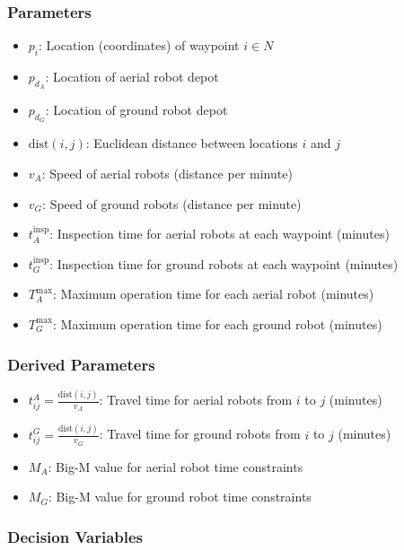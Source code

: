 \documentclass{article}
\begin{document}
			\subsubsection{Parameters}

				\begin{itemize}
				\item $p_i$: Location (coordinates) of waypoint $i \in N$
				\item $p_{d_A}$: Location of aerial robot depot
				\item $p_{d_G}$: Location of ground robot depot
				\item $\text{dist}(i,j)$: Euclidean distance between locations $i$ and $j$
				\item $v_A$: Speed of aerial robots (distance per minute)
				\item $v_G$: Speed of ground robots (distance per minute)
				\item $t_A^{\text{insp}}$: Inspection time for aerial robots at each waypoint (minutes)
				\item $t_G^{\text{insp}}$: Inspection time for ground robots at each waypoint (minutes)
				\item $T_A^{\max}$: Maximum operation time for each aerial robot (minutes)
				\item $T_G^{\max}$: Maximum operation time for each ground robot (minutes)
				\end{itemize}

			\subsubsection{Derived Parameters}

				\begin{itemize}
				\item $t_{ij}^{A} = \frac{\text{dist}(i,j)}{v_A}$: Travel time for aerial robots from $i$ to $j$ (minutes)
				\item $t_{ij}^{G} = \frac{\text{dist}(i,j)}{v_G}$: Travel time for ground robots from $i$ to $j$ (minutes)
				\item $M_A$: Big-M value for aerial robot time constraints
				\item $M_G$: Big-M value for ground robot time constraints
				\end{itemize}

			\subsubsection{Decision Variables}
\end{document}
